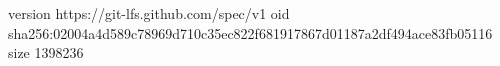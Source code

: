 version https://git-lfs.github.com/spec/v1
oid sha256:02004a4d589c78969d710c35ec822f681917867d01187a2df494ace83fb05116
size 1398236
